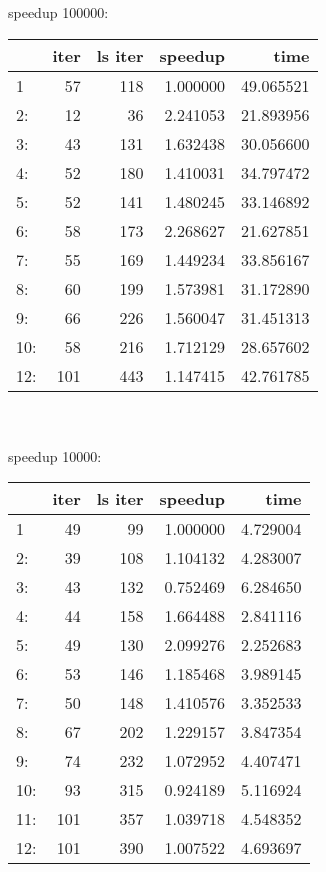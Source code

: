 \documentclass[11pt,a4paper]{article}
\begin{document}
speedup 100000:
\\ 
\begin{tabular}{lrrrr}
\toprule
{} &  iter &  ls iter &   speedup &       time \\
\midrule
1   &    57 &      118 &  1.000000 &  49.065521 \\
2:  &    12 &       36 &  2.241053 &  21.893956 \\
3:  &    43 &      131 &  1.632438 &  30.056600 \\
4:  &    52 &      180 &  1.410031 &  34.797472 \\
5:  &    52 &      141 &  1.480245 &  33.146892 \\
6:  &    58 &      173 &  2.268627 &  21.627851 \\
7:  &    55 &      169 &  1.449234 &  33.856167 \\
8:  &    60 &      199 &  1.573981 &  31.172890 \\
9:  &    66 &      226 &  1.560047 &  31.451313 \\
10: &    58 &      216 &  1.712129 &  28.657602 \\
12: &   101 &      443 &  1.147415 &  42.761785 \\
\bottomrule
\end{tabular}
\\ 
\\ 
speedup 10000:
\\ 
\begin{tabular}{lrrrr}
\toprule
{} &  iter &  ls iter &   speedup &      time \\
\midrule
1   &    49 &       99 &  1.000000 &  4.729004 \\
2:  &    39 &      108 &  1.104132 &  4.283007 \\
3:  &    43 &      132 &  0.752469 &  6.284650 \\
4:  &    44 &      158 &  1.664488 &  2.841116 \\
5:  &    49 &      130 &  2.099276 &  2.252683 \\
6:  &    53 &      146 &  1.185468 &  3.989145 \\
7:  &    50 &      148 &  1.410576 &  3.352533 \\
8:  &    67 &      202 &  1.229157 &  3.847354 \\
9:  &    74 &      232 &  1.072952 &  4.407471 \\
10: &    93 &      315 &  0.924189 &  5.116924 \\
11: &   101 &      357 &  1.039718 &  4.548352 \\
12: &   101 &      390 &  1.007522 &  4.693697 \\
\bottomrule
\end{tabular}
\end{document}

